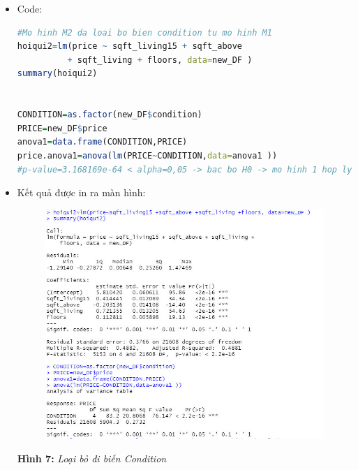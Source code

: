 \documentclass[a4paper]{article}
\theoremstyle{definition}
\begin{document}
\begin{itemize}
\begin{enumerate}
\begin{enumerate}
        \begin{itemize}
            \item Code:
            
            \begin{lstlisting}[language=R, caption=Code for question 4c]
#Mo hinh M2 da loai bo bien condition tu mo hinh M1       
hoiqui2=lm(price ~ sqft_living15 + sqft_above 
          + sqft_living + floors, data=new_DF )
summary(hoiqui2) 

 
CONDITION=as.factor(new_DF$condition)
PRICE=new_DF$price
anova1=data.frame(CONDITION,PRICE)
price.anova1=anova(lm(PRICE~CONDITION,data=anova1 ))
#p-value=3.168169e-64 < alpha=0,05 -> bac bo H0 -> mo hinh 1 hop ly hon
            \end{lstlisting}
            
            \item Kết quả được in ra màn hình:
            
            \begin{figure}[H]
                \centering
                \includegraphics[scale=0.7]{4f.jpg}
                \label{fig:my_label}
            \end{figure}
        
            \begin{center}
                \textbf{Hình 7: }\textit{Loại bỏ đi biến Condition}
            \end{center}
            
        \end{itemize}
        

\end{enumerate}
\end{enumerate}
\end{itemize}
\end{document}
